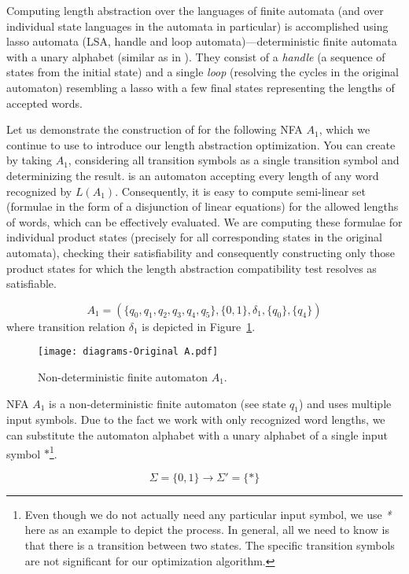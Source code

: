 Computing length abstraction over the languages of finite automata (and over individual state languages in the automata in particular) is accomplished using lasso automata (LSA, handle and loop automata)---deterministic finite automata with a unary alphabet (similar as in \cite{DBLP:conf/cav/AbdullaACHRRS14}). They consist of a \emph{handle} (a sequence of states from the initial state) and a single \emph{loop} (resolving the cycles in the original automaton) resembling a lasso with a few final states representing the lengths of accepted words.

Let us demonstrate the construction of  for the following NFA $A_1$, which we continue to use to introduce our length abstraction optimization. You can create  by taking $A_1$, considering all transition symbols as a single transition symbol and determinizing the result.  is an automaton accepting every length of any word recognized by $L(A_1)$. Consequently, it is easy to compute semi-linear set (formulae in the form of a disjunction of linear equations) for the allowed lengths of words, which can be effectively evaluated. We are computing these formulae for individual product states (precisely for all corresponding states in the original automata), checking their satisfiability and consequently constructing only those product states for which the length abstraction compatibility test resolves as satisfiable.

$$ A_1 = (\{q_0, q_1, q_2, q_3, q_4, q_5\}, \{0, 1\}, \delta_1, \{q_0\}, \{q_4\}) $$
where transition relation $\delta_1$ is depicted in Figure~\ref{fig:NFA_A1_orig}.

\begin{figure}[ht]
	\centering
	\texttt{[image: diagrams-Original A.pdf]}
	\caption{Non-deterministic finite automaton $A_1$.}
	\label{fig:NFA_A1_orig}
\end{figure}

NFA $A_1$ is a non-deterministic finite automaton (see state $q_1$) and uses multiple input symbols. Due to the fact we work with only recognized word lengths, we can substitute the automaton alphabet with a unary alphabet of a single input symbol $*$\footnote{Even though we do not actually need any particular input symbol, we use \emph{*} here as an example to depict the process. In general, all we need to know is that there is a transition between two states. The specific transition symbols are not significant for our optimization algorithm.}.

$$\Sigma = \{0, 1\} \longrightarrow \Sigma' = \{*\} $$

